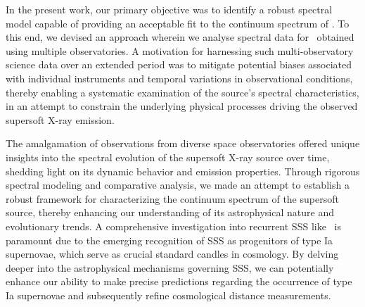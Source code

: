 	In the present work, our primary objective was to identify a robust spectral model capable of providing an acceptable fit to the continuum spectrum of \source. To this end, we devised an approach wherein we analyse spectral data for \source\ obtained using multiple observatories. A motivation for harnessing such multi-observatory science data over an extended period was to mitigate potential biases associated with individual instruments and temporal variations in observational conditions, thereby enabling a systematic examination of the source's spectral characteristics, in an attempt to constrain the underlying physical processes driving the observed supersoft X-ray emission.
	
	The amalgamation of observations from diverse space observatories offered unique insights into the spectral evolution of the supersoft X-ray source over time, shedding light on its dynamic behavior and emission properties. Through rigorous spectral modeling and comparative analysis, we made an attempt to establish a robust framework for characterizing the continuum spectrum of the supersoft source, thereby enhancing our understanding of its astrophysical nature and evolutionary trends. A comprehensive investigation into recurrent SSS like \source\ is paramount due to the emerging recognition of SSS as progenitors of type Ia supernovae, which serve as crucial standard candles in cosmology. By delving deeper into the astrophysical mechanisms governing SSS, we can potentially enhance our ability to make precise predictions regarding the occurrence of type Ia supernovae and subsequently refine cosmological distance measurements. %